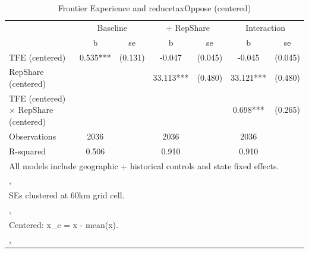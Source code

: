 \begin{table}[htbp]\centering
\def\sym#1{\ifmmode^{#1}\else\(^{#1}\)\fi}
\caption{Frontier Experience and reducetaxOppose (centered)}
\begin{tabular}{l*{3}{cc}}
\toprule
                &\multicolumn{2}{c}{Baseline}&\multicolumn{2}{c}{ + RepShare}&\multicolumn{2}{c}{Interaction}\\
                &        b   &       se&        b   &       se&        b   &       se\\
\midrule
TFE (centered)  &    0.535***&  (0.131)&   -0.047   &  (0.045)&   -0.045   &  (0.045)\\
RepShare (centered)&            &         &   33.113***&  (0.480)&   33.121***&  (0.480)\\
TFE (centered) $\times$ RepShare (centered)&            &         &            &         &    0.698***&  (0.265)\\
\midrule
Observations    &     2036   &         &     2036   &         &     2036   &         \\
R-squared       &    0.506   &         &    0.910   &         &    0.910   &         \\
\bottomrule
\multicolumn{7}{l}{\footnotesize All models include geographic + historical controls and state fixed effects.}\\
\multicolumn{7}{l}{\footnotesize ,}\\
\multicolumn{7}{l}{\footnotesize SEs clustered at 60km grid cell.}\\
\multicolumn{7}{l}{\footnotesize ,}\\
\multicolumn{7}{l}{\footnotesize Centered: x\_c = x - mean(x).}\\
\multicolumn{7}{l}{\footnotesize ,}\\
\end{tabular}
\end{table}
